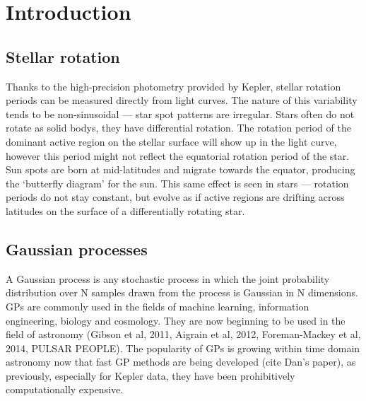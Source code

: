 \documentclass[12pt,preprint]{aastex}
\begin{document}
\section{Introduction}

\subsection{Stellar rotation}

Thanks to the high-precision photometry provided by Kepler, stellar rotation periods can be measured directly from light curves.
The nature of this variability tends to be non-sinusoidal --- star spot patterns are irregular.
Stars often do not rotate as solid bodys, they have differential rotation.
The rotation period of the dominant active region on the stellar surface will show up in the light curve, however this period might not reflect the equatorial rotation period of the star.
Sun spots are born at mid-latitudes and migrate towards the equator, producing the `butterfly diagram' for the sun.
This same effect is seen in stars --- rotation periods do not stay constant, but evolve as if active regions are drifting across latitudes on the surface of a differentially rotating star.

\subsection{Gaussian processes}

A Gaussian process is any stochastic process in which the joint probability distribution over N samples drawn from the process is Gaussian in N dimensions.
GPs are commonly used in the fields of machine learning, information engineering, biology and cosmology.
They are now beginning to be used in the field of astronomy (Gibson et al, 2011, Aigrain et al, 2012, Foreman-Mackey et al, 2014, PULSAR PEOPLE).
The popularity of GPs is growing within time domain astronomy now that fast GP methods are being developed (cite Dan's paper), as previously, especially for Kepler data, they have been prohibitively computationally expensive.
\end{document}
